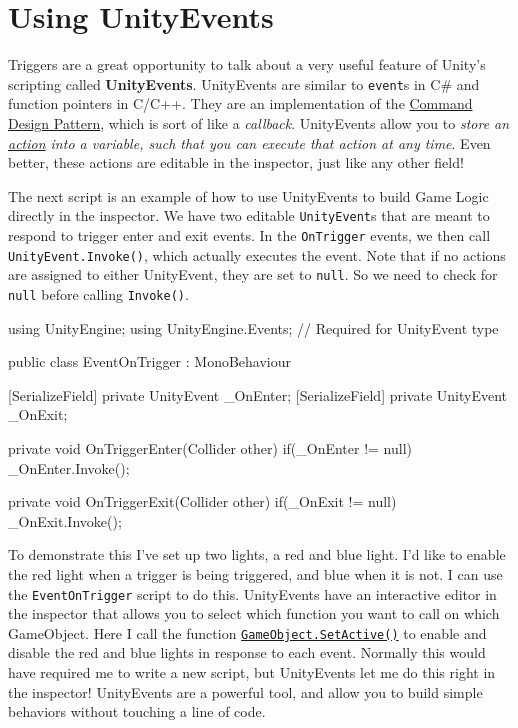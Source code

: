 \documentclass[11pt]{article}
\def\StartLineAt#1{\lstset{firstnumber=#1}}
\begin{document}
\section{Using UnityEvents}

Triggers are a great opportunity to talk about a very useful feature of Unity's scripting called
\textbf{UnityEvents}.  UnityEvents are similar to \lstinline|event|s in C\# and function pointers 
in C/C++.  They are an implementation of the 
\href{http://gameprogrammingpatterns.com/command.html}{Command Design Pattern}, which is sort of like
a \textit{callback}.  UnityEvents allow you to \textit{store an \underline{action} into a
variable, such that you can execute that action at any time}.  Even better, these actions are editable
in the inspector, just like any other field!

The next script is an example of how to use UnityEvents to build Game Logic directly in the 
inspector.  We have two editable \lstinline|UnityEvent|s that are meant to respond to trigger
enter and exit events.  In the \lstinline|OnTrigger| events, we then call \lstinline|UnityEvent.Invoke()|,
which actually executes the event.  Note that if no actions are assigned to either UnityEvent,
they are set to \lstinline|null|.  So we need to check for \lstinline|null| before calling 
\lstinline|Invoke()|.\\

\StartLineAt{1}
\begin{csharp}
using UnityEngine;
using UnityEngine.Events; // Required for UnityEvent type

public class EventOnTrigger : MonoBehaviour
{
    [SerializeField]
    private UnityEvent _OnEnter;
    [SerializeField]
    private UnityEvent _OnExit;

    private void OnTriggerEnter(Collider other)
    {
        if(_OnEnter != null)
            _OnEnter.Invoke();
    }

    private void OnTriggerExit(Collider other)
    {
        if(_OnExit != null)
            _OnExit.Invoke();
    }
}
\end{csharp}

To demonstrate this I've set up two lights, a red and blue light.  I'd like to enable the red light
when a trigger is being triggered, and blue when it is not.  I can use the \lstinline|EventOnTrigger|
script to do this.  UnityEvents have an interactive editor in the inspector that allows you to select
which function you want to call on which GameObject.  Here I call the function 
\href{https://docs.unity3d.com/ScriptReference/GameObject.SetActive.html}{\lstinline|GameObject.SetActive()|}
to enable and disable the red and blue lights in response to each event.  Normally this would have
required me to write a new script, but UnityEvents let me do this right in the inspector!  UnityEvents
are a powerful tool, and allow you to build simple behaviors without touching a line of code.
\end{document}
